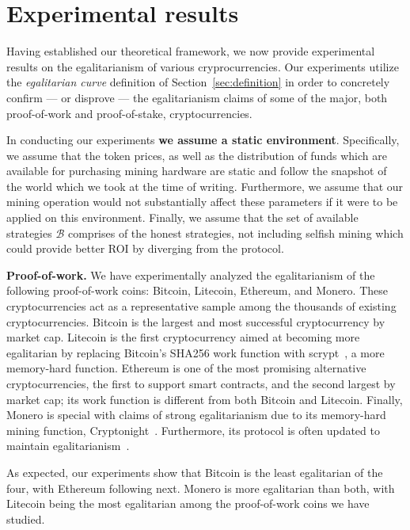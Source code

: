 \section{Experimental results}\label{sec:experiments}

Having established our theoretical framework, we now provide experimental
results on the egalitarianism of various cryprocurrencies. Our experiments
utilize the \emph{egalitarian curve} definition of Section~\ref{sec:definition}
in order to concretely confirm --- or disprove --- the egalitarianism claims of
some of the major, both proof-of-work and proof-of-stake, cryptocurrencies.

In conducting our experiments \textbf{we assume a static environment}.
Specifically, we assume that the token prices, as well as the distribution of
funds which are available for purchasing mining hardware are static and follow
the snapshot of the world which we took at the time of writing. Furthermore, we
assume that our mining operation would not substantially affect these
parameters if it were to be applied on this environment. Finally, we assume
that the set of available strategies $\mathcal{B}$ comprises of the honest
strategies, \eg not including selfish mining which could provide better ROI
by diverging from the protocol.

\noindent\textbf{Proof-of-work.}
\noindent
We have experimentally analyzed the egalitarianism of the following
proof-of-work coins: Bitcoin, Litecoin, Ethereum, and Monero. These
cryptocurrencies act as a representative sample among the thousands of existing
cryptocurrencies. Bitcoin is the largest and most successful cryptocurrency by
market cap. Litecoin is the first cryptocurrency aimed at becoming more
egalitarian by replacing Bitcoin's SHA256 work function with scrypt~\cite{percival2016scrypt}, a more
memory-hard function. Ethereum is one of the most promising alternative
cryptocurrencies, the first to support smart contracts, and the second largest
by market cap; its work function is different from both Bitcoin and Litecoin.
Finally, Monero is special with claims of strong egalitarianism due to its
memory-hard mining function, Cryptonight~\cite{van2013cryptonote}. Furthermore, its protocol is often
updated to maintain
egalitarianism~\cite{monero-hard-asic}.

As expected, our experiments show that Bitcoin is the least egalitarian of the
four, with Ethereum following next. Monero is more egalitarian than both, with
Litecoin being the most egalitarian among the proof-of-work coins
we have studied. 

